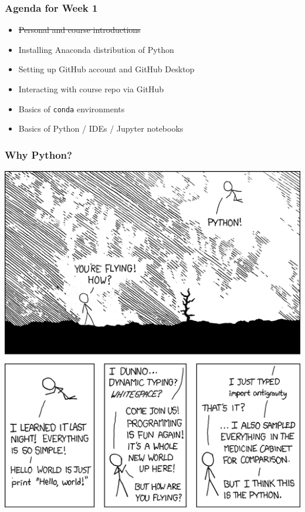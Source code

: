 \documentclass[aspectratio=169]{beamer}
\begin{document}
\begin{frame}
\frametitle{Agenda for Week 1}
\begin{itemize}
	\item \st{Personal and course introductions}
	
	\item Installing Anaconda distribution of Python
	
	\item Setting up GitHub account and GitHub Desktop
	
	\item Interacting with course repo via GitHub
	
	\item Basics of \texttt{conda} environments
	
	\item Basics of Python / IDEs / Jupyter notebooks
\end{itemize}
\end{frame}


\begin{frame}
\frametitle{Why Python?}
\centering
\includegraphics[scale=0.35]{../../media/xkcdpython.png}
\end{frame}
\end{document}
